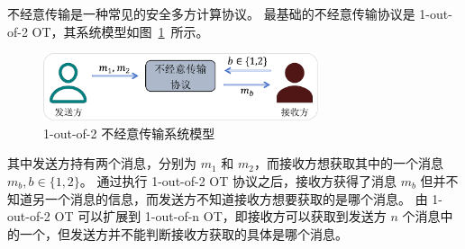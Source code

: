 不经意传输是一种常见的安全多方计算协议。
最基础的不经意传输协议是 1-out-of-2 OT，其系统模型如图~\ref{fig:ot_protocol}~所示。
\begin{figure}[ht]
  \centering
  \includegraphics[width=0.72\textwidth]{figures/ot_pro.pdf}
  \caption{1-out-of-2 不经意传输系统模型}
  \label{fig:ot_protocol}
\end{figure}
其中发送方持有两个消息，分别为 $m_1$ 和 $m_2$，而接收方想获取其中的一个消息 $m_b, b\in\{1,2\}$。
通过执行 1-out-of-2 OT 协议之后，接收方获得了消息 $m_b$ 但并不知道另一个消息的信息，而发送方不知道接收方想要获取的是哪个消息。
由 1-out-of-2 OT 可以扩展到 1-out-of-n OT，即接收方可以获取到发送方 $n$ 个消息中的一个，但发送方并不能判断接收方获取的具体是哪个消息。

